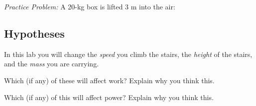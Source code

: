 \documentclass[10pt]{exam}
\begin{document}
\begin{questions}


\question
  \emph{Practice Problem:} A 20-kg box is lifted 3 m into the air:


  
  
  
  
  
\begin{EnvUplevel}

  \section*{Hypotheses}
  
  In this lab you will change the \emph{speed} you climb the stairs, the \emph{height} of the stairs, and the \emph{mass} you are carrying.

\end{EnvUplevel}

  
\question
  Which (if any) of these will affect work?  Explain why you think this.
  \vs[2]
  
  
\question
  Which (if any) of this will affect power?  Explain why you think this.
  \vs
  

\end{questions}
\end{document}
